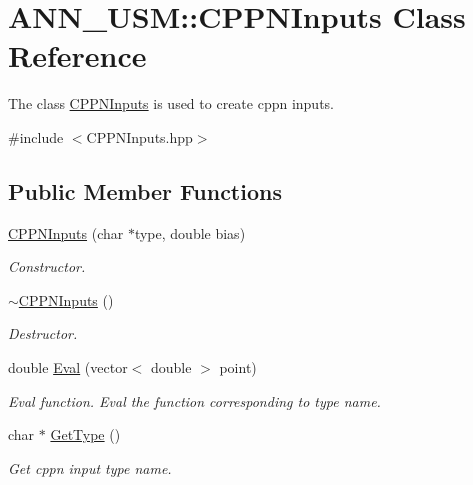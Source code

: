 \hypertarget{class_a_n_n___u_s_m_1_1_c_p_p_n_inputs}{\section{A\-N\-N\-\_\-\-U\-S\-M\-:\-:C\-P\-P\-N\-Inputs Class Reference}
\label{class_a_n_n___u_s_m_1_1_c_p_p_n_inputs}
}


The class \hyperlink{class_a_n_n___u_s_m_1_1_c_p_p_n_inputs}{C\-P\-P\-N\-Inputs} is used to create cppn inputs.  




{\ttfamily \#include $<$C\-P\-P\-N\-Inputs.\-hpp$>$}

\subsection*{Public Member Functions}
\begin{DoxyCompactItemize}
\item 
\hyperlink{class_a_n_n___u_s_m_1_1_c_p_p_n_inputs_a8e11fc60cf97088554222a49a9e2138d}{C\-P\-P\-N\-Inputs} (char $\ast$type, double bias)
\begin{DoxyCompactList}\small\item\em Constructor. \end{DoxyCompactList}\item 
\hyperlink{class_a_n_n___u_s_m_1_1_c_p_p_n_inputs_a4cf182897edc0aab6396309fb805d17d}{$\sim$\-C\-P\-P\-N\-Inputs} ()
\begin{DoxyCompactList}\small\item\em Destructor. \end{DoxyCompactList}\item 
double \hyperlink{class_a_n_n___u_s_m_1_1_c_p_p_n_inputs_a2d83e6f6066f241024a435f23aaf6519}{Eval} (vector$<$ double $>$ point)
\begin{DoxyCompactList}\small\item\em Eval function. Eval the function corresponding to type name. \end{DoxyCompactList}\item 
char $\ast$ \hyperlink{class_a_n_n___u_s_m_1_1_c_p_p_n_inputs_af3b8e063ed149d720edcd4baab27e948}{Get\-Type} ()
\begin{DoxyCompactList}\small\item\em Get cppn input type name. \end{DoxyCompactList}\end{DoxyCompactItemize}


